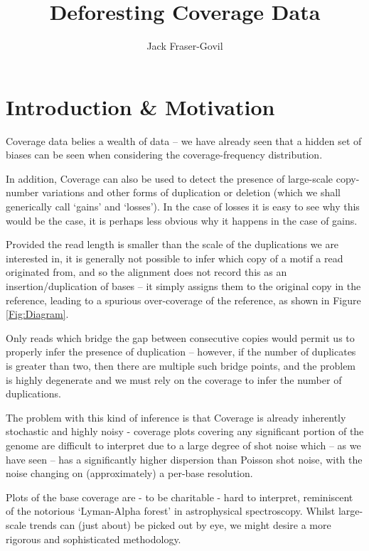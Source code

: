 \documentclass[fleqn,usenatbib]{mnras}
\title[Deforesting]{Deforesting Coverage Data}
\author[J. Fraser-Govil]{Jack Fraser-Govil
}
\begin{document}
	\label{firstpage}
	\pagerange{\pageref{firstpage}--\pageref{lastpage}}
	\maketitle
	
	\section{Introduction \& Motivation}
	
		Coverage data belies a wealth of data -- we have already seen that a hidden set of biases can be seen when considering the coverage-frequency distribution. 

		In addition, Coverage can also be used to detect the presence of large-scale copy-number variations and other forms of duplication or deletion (which we shall generically call `gains' and `losses'). In the case of losses it is easy to see why this would be the case, it is perhaps less obvious why it happens in the case of gains.
		
		Provided the read length is smaller than the scale of the duplications we are interested in, it is generally not possible to infer which copy of a motif a read originated from, and so the alignment does not record this as an insertion/duplication of bases -- it simply assigns them to the original copy in the reference, leading to a spurious over-coverage of the reference, as shown in Figure \ref{Fig:Diagram}.

		Only reads which bridge the gap between consecutive copies would permit us to properly infer the presence of duplication -- however, if the number of duplicates is greater than two, then there are multiple such bridge points, and the problem is highly degenerate and we must rely on the coverage to infer the number of duplications. 
		
		The problem with this kind of inference is that Coverage is already inherently stochastic and highly noisy - coverage plots covering any significant portion of the genome are difficult to interpret due to a large degree of shot noise which -- as we have seen -- has a significantly higher dispersion than Poisson shot noise, with the noise changing on (approximately) a per-base resolution. 

		Plots of the base coverage are - to be charitable - hard to interpret, reminiscent of the notorious `Lyman-Alpha forest' in astrophysical spectroscopy. Whilst large-scale trends can (just about) be picked out by eye, we might desire a more rigorous and sophisticated methodology.  
\end{document}
